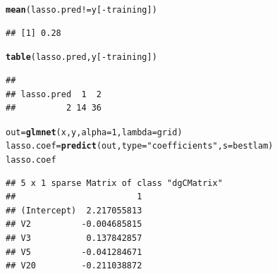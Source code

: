 \documentclass{article}\usepackage[]{graphicx}\usepackage[]{color}
\makeatletter
\newcommand{\hlnum}[1]{\textcolor[rgb]{0.686,0.059,0.569}{#1}}%
\newcommand{\hlstr}[1]{\textcolor[rgb]{0.192,0.494,0.8}{#1}}%
\newcommand{\hlopt}[1]{\textcolor[rgb]{0,0,0}{#1}}%
\newcommand{\hlstd}[1]{\textcolor[rgb]{0.345,0.345,0.345}{#1}}%
\newcommand{\hlkwb}[1]{\textcolor[rgb]{0.69,0.353,0.396}{#1}}%
\newcommand{\hlkwc}[1]{\textcolor[rgb]{0.333,0.667,0.333}{#1}}%
\newcommand{\hlkwd}[1]{\textcolor[rgb]{0.737,0.353,0.396}{\textbf{#1}}}%
\newenvironment{kframe}{%
 \def\at@end@of@kframe{}%
 \ifinner\ifhmode%
  \def\at@end@of@kframe{\end{minipage}}%
  \begin{minipage}{\columnwidth}%
 \fi\fi%
 \def\FrameCommand##1{\hskip\@totalleftmargin \hskip-\fboxsep
 \colorbox{shadecolor}{##1}\hskip-\fboxsep
     \hskip-\linewidth \hskip-\@totalleftmargin \hskip\columnwidth}%
 \MakeFramed {\advance\hsize-\width
   \@totalleftmargin\z@ \linewidth\hsize
   \@setminipage}}%
 {\par\unskip\endMakeFramed%
 \at@end@of@kframe}
\newenvironment{knitrout}{}{} %
\makeatother
\begin{document}
\begin{knitrout}
\begin{kframe}
\begin{alltt}
\hlkwd{mean}\hlstd{(lasso.pred} \hlopt{!=} \hlstd{y[}\hlopt{-}\hlstd{training])}
\end{alltt}
\begin{verbatim}
## [1] 0.28
\end{verbatim}
\begin{alltt}
\hlkwd{table}\hlstd{(lasso.pred, y[}\hlopt{-}\hlstd{training])}
\end{alltt}
\begin{verbatim}
##           
## lasso.pred  1  2
##          2 14 36
\end{verbatim}
\begin{alltt}
\hlstd{out}\hlkwb{=}\hlkwd{glmnet}\hlstd{(x,y,}\hlkwc{alpha}\hlstd{=}\hlnum{1}\hlstd{,}\hlkwc{lambda}\hlstd{=grid)}
\hlstd{lasso.coef}\hlkwb{=}\hlkwd{predict}\hlstd{(out,}\hlkwc{type}\hlstd{=}\hlstr{"coefficients"}\hlstd{,}\hlkwc{s}\hlstd{=bestlam)}
\hlstd{lasso.coef}
\end{alltt}
\begin{verbatim}
## 5 x 1 sparse Matrix of class "dgCMatrix"
##                        1
## (Intercept)  2.217055813
## V2          -0.004685815
## V3           0.137842857
## V5          -0.041284671
## V20         -0.211038872
\end{verbatim}
\end{kframe}
\end{knitrout}
\end{document}
